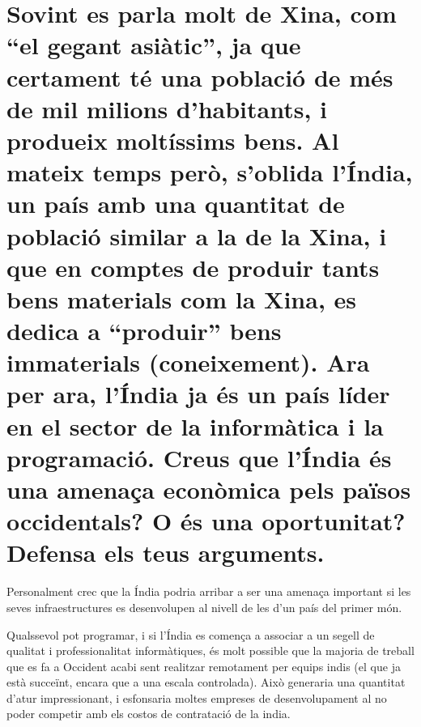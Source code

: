 \section {
  Sovint es parla molt de Xina, com “el gegant asiàtic”, ja que certament
  té una població de més de mil milions d’habitants, 
  i produeix moltíssims bens.
  Al mateix temps però, s’oblida l’Índia, 
  un país amb una quantitat de població similar a la
  de la Xina, i que en comptes de produir tants bens materials com la Xina,
  es dedica a “produir” bens immaterials (coneixement). 
  Ara per ara, l’Índia ja és un país líder en el
  sector de la informàtica i la programació. 
  Creus que l’Índia és una amenaça econòmica pels països occidentals? 
  O és una oportunitat? Defensa els teus arguments.
}

Personalment crec que la Índia podria arribar a ser una amenaça important
si les seves infraestructures es desenvolupen al nivell de les d'un país
del primer món.

Qualssevol pot programar, i si l'Índia es comença a associar a un segell
de qualitat i professionalitat informàtiques, és molt possible que la 
majoria de treball que es fa a Occident acabi sent realitzar remotament
per equips indis (el que ja està succeïnt, encara que a una escala 
controlada). Això generaria una quantitat d'atur impressionant, i 
esfonsaria moltes empreses de desenvolupament al no poder competir amb
els costos de contratació de la india.
